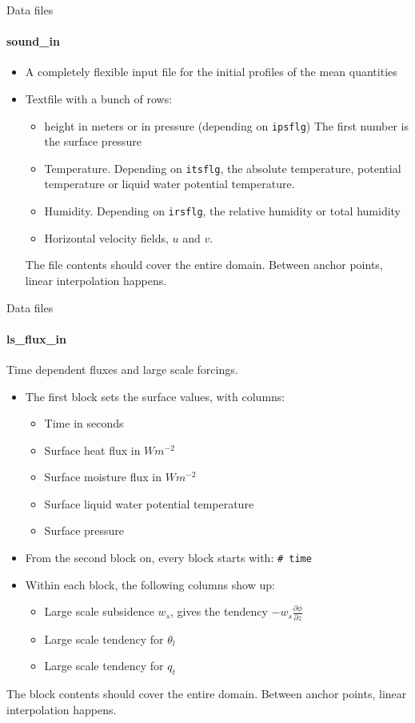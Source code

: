 \documentclass[handout]{beamer}
\newcommand{\derr}[2]{\frac{\partial #1}{\partial #2}}
\newcommand{\code}[1]{{\tt #1}}
\begin{document}
\begin{frame}{Data files}
\framesubtitle{sound\_in}
\begin{itemize}
 \item A completely flexible input file for the initial profiles of the mean quantities
 \item Textfile with a bunch of rows:
\begin{itemize}
 \item height in meters or in pressure (depending on \code{ipsflg}) The first number is the surface pressure
 \item Temperature. Depending on \code{itsflg}, the absolute temperature, potential temperature or liquid water potential temperature. 
 \item Humidity. Depending on \code{irsflg}, the relative humidity or total humidity
 \item Horizontal velocity fields, $u$ and $v$.
\end{itemize}
The file contents should cover the entire domain. Between anchor points, linear interpolation happens.
\end{itemize}
\end{frame}

\begin{frame}{Data files}
\framesubtitle{ls\_flux\_in} 
Time dependent fluxes and large scale forcings. 
\begin{itemize}
 \item The first block sets the surface values, with columns:
\begin{itemize}
 \item Time in seconds
 \item 	Surface heat flux in $W m^{-2}$
 \item 	Surface moisture flux in $W m^{-2}$
 \item Surface liquid water potential temperature
 \item Surface pressure
\end{itemize}
 \item From the  second block on, every block starts with: \code{\# time}
 \item Within each block, the following columns show up:
 \begin{itemize}
   \item Large scale subsidence $w_s$, gives the tendency $-w_s\derr{\phi}{z}$
   \item Large scale tendency for $\theta_l$
   \item Large scale tendency for $q_t$
  \end{itemize}
\end{itemize}
The block contents should cover the entire domain. Between anchor points, linear interpolation happens.
\end{frame}
 
\end{document}
